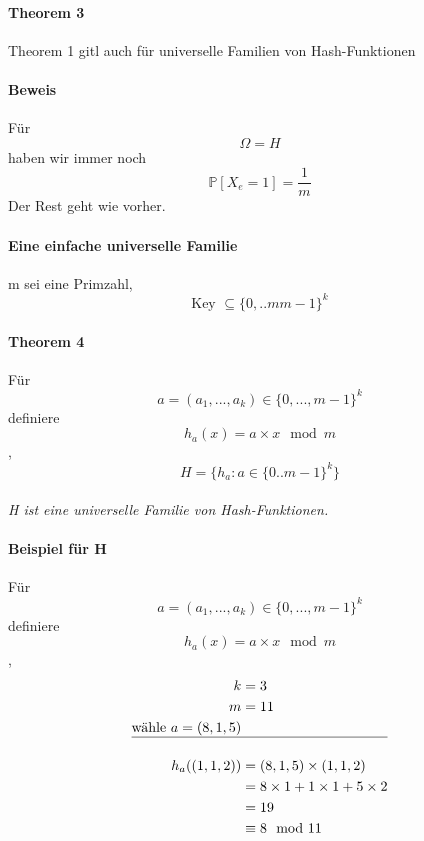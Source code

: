 \documentclass[a4paper]{scrartcl}
\begin{document}
	 	\paragraph{Theorem 3}
	 	Theorem 1 gitl auch für universelle Familien von Hash-Funktionen
	 	
	 	\paragraph{Beweis}
	 	Für \[ \Omega = H \]
	 	haben wir immer noch 
	 	\[ \mathbb{P}[X_e = 1] = \frac{1}{m} \]
	 	Der Rest geht wie vorher.
	 	
	 \paragraph{Eine einfache universelle Familie}
	 m sei eine Primzahl, 
	 \[ \text{Key } \subseteq \{ 0,..m m - 1 \}^k  \]
	 
	 \paragraph{Theorem 4}
	 Für \[ a = (a_1,..., a_k) \in \{0,..., m-1\}^k  \]
	 definiere \[h_a(x) = a \times x \mod m \],
	 \[ H = \{h_a : a \in \{ 0.. m-1 \}^k \} \]\\
	 \emph{H ist eine universelle Familie von Hash-Funktionen.}
	 
	 \paragraph{Beispiel für H}
	 Für \[ a = (a_1,..., a_k) \in \{0,..., m-1\}^k  \]
	 definiere \[h_a(x) = a \times x \mod m \],
	 \begin{align*}
	 	k &= 3\\
	 	m &= 11 \\
	 	\text{wähle } a = (8, 1, 5)\\ \hline
	 	\\
	 	h_a ((1, 1, 2)) &= (8, 1, 5) \times (1, 1, 2)\\
	 	&= 8 \times 1 + 1 \times 1+5 \times 2\\
	 	&=19\\
	 	&\equiv 8 \mod 11\\
	 \end{align*}
	 
\end{document}
